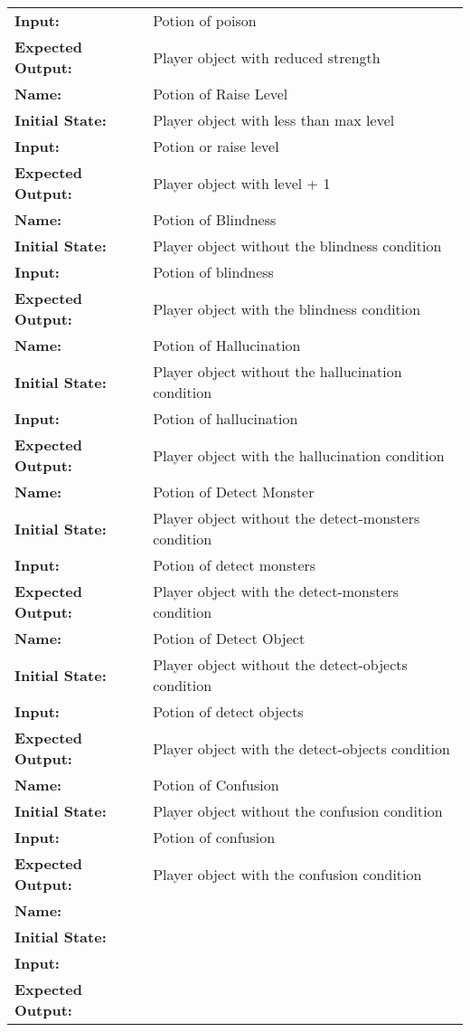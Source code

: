 \documentclass[12pt, titlepage]{article}
\begin{document}
\begin{center}
\begin{longtable}{ l | l }
\textbf{Input:} & Potion of poison\\
\textbf{Expected Output:} & Player object with reduced strength\\
\hline
\textbf{Name:} & Potion of Raise Level\\
\textbf{Initial State:} & Player object with less than max level\\
\textbf{Input:} & Potion or raise level\\
\textbf{Expected Output:} & Player object with level + 1\\
\hline
\textbf{Name:} & Potion of Blindness\\
\textbf{Initial State:} & Player object without the blindness condition\\
\textbf{Input:} & Potion of blindness\\
\textbf{Expected Output:} & Player object with the blindness condition\\
\hline
\textbf{Name:} & Potion of Hallucination\\
\textbf{Initial State:} & Player object without the hallucination condition\\
\textbf{Input:} & Potion of hallucination\\
\textbf{Expected Output:} & Player object with the hallucination condition\\
\hline
\textbf{Name:} & Potion of Detect Monster\\
\textbf{Initial State:} & Player object without the detect-monsters condition\\
\textbf{Input:} & Potion of detect monsters\\
\textbf{Expected Output:} & Player object with the detect-monsters condition\\
\hline
\textbf{Name:} & Potion of Detect Object\\
\textbf{Initial State:} & Player object without the detect-objects condition\\
\textbf{Input:} & Potion of detect objects\\
\textbf{Expected Output:} & Player object with the detect-objects condition\\
\hline
\textbf{Name:} & Potion of Confusion\\
\textbf{Initial State:} & Player object without the confusion condition\\
\textbf{Input:} & Potion of confusion\\
\textbf{Expected Output:} & Player object with the confusion condition\\
\hline



\textbf{Name:} & \\
\textbf{Initial State:} & \\
\textbf{Input:} & \\
\textbf{Expected Output:} & \\
\hline

\end{longtable}

\end{center}
		
\end{document}
